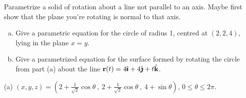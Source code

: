 \begin{question}
Parametrize a solid of rotation about a line not parallel to an axis. Maybe first show that the plane you're rotating is normal to that axis.

\begin{enumerate}[(a)]
\item Give a parametric equation for the circle of radius 1, centred at $(2,2,4)$, lying in the plane $x=y$.
\item Give a parametrized equation for the surface formed by rotating the circle from part (a) about the line $\mathbf{r}(t)=4\hat{\pmb{\imath}}+4\hat{\pmb{\jmath}}+t\hat{\mathbf{k}}$. 
\end{enumerate}
\begin{center}
\end{center}

\end{question}
\begin{answer}
(a) $(x,y,z)=(2+\frac1{\sqrt 2}\cos\theta~,~2+\frac1{\sqrt 2}\cos\theta~,~4+\sin\theta)$, $0 \le \theta \le 2\pi$.
\end{answer}
